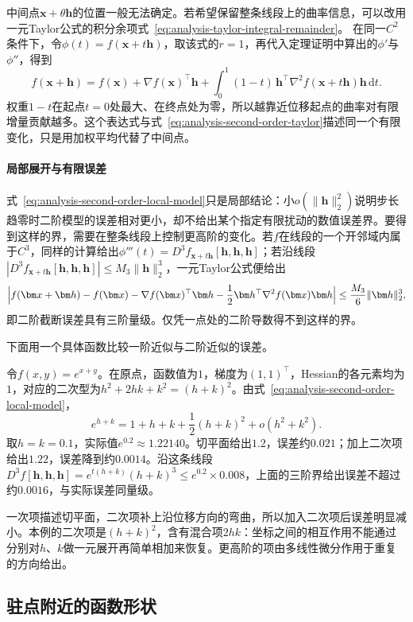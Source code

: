 中间点$\bm x+\theta\bm h$的位置一般无法确定。若希望保留整条线段上的曲率信息，可以改用一元Taylor公式的积分余项式~\eqref{eq:analysis-taylor-integral-remainder}。
在同一$C^2$条件下，令$\phi(t)=f(\bm x+t\bm h)$，取该式的$r=1$，再代入定理证明中算出的$\phi'$与$\phi''$，得到
\[
 f(\bm{x}+\bm{h})
 =f(\bm{x})+\nabla f(\bm{x})^{\top}\bm{h}
 +\int_0^1(1-t)\,\bm{h}^{\top}\nabla^2f(\bm{x}+t\bm{h})\bm{h}\,\mathrm{d}t.
\]
权重$1-t$在起点$t=0$处最大、在终点处为零，所以越靠近位移起点的曲率对有限增量贡献越多。这个表达式与式~\eqref{eq:analysis-second-order-taylor}描述同一个有限变化，只是用加权平均代替了中间点。

\paragraph{局部展开与有限误差}
式~\eqref{eq:analysis-second-order-local-model}只是局部结论：小$o(\lVert\bm h\rVert_2^2)$说明步长趋零时二阶模型的误差相对更小，却不给出某个指定有限扰动的数值误差界。要得到这样的界，需要在整条线段上控制更高阶的变化。若$f$在线段的一个开邻域内属于$C^3$，同样的计算给出$\phi'''(t)=D^3f_{\bm x+t\bm h}[\bm h,\bm h,\bm h]$；若沿线段$|D^3f_{\bm x+t\bm h}[\bm h,\bm h,\bm h]|\leq M_3\lVert\bm h\rVert_2^3$，一元Taylor公式便给出
\[
 \Bigl|f(\bm x+\bm h)-f(\bm x)-\nabla f(\bm x)^\top\bm h-\frac12\bm h^\top\nabla^2f(\bm x)\bm h\Bigr|\leq\frac{M_3}6\lVert\bm h\rVert_2^3 ,
\]
即二阶截断误差具有三阶量级。仅凭一点处的二阶导数得不到这样的界。

下面用一个具体函数比较一阶近似与二阶近似的误差。
\begin{example}[指数函数的二阶Taylor近似]
\label{ex:multivariable-exponential-taylor}
令$f(x,y)=e^{x+y}$。在原点，函数值为$1$，梯度为$(1,1)^\top$，Hessian的各元素均为$1$，对应的二次型为$h^2+2hk+k^2=(h+k)^2$。由式~\eqref{eq:analysis-second-order-local-model}，
\[
 e^{h+k}=1+h+k+\frac12(h+k)^2+o(h^2+k^2).
\]
取$h=k=0.1$，实际值$e^{0.2}\approx1.22140$。切平面给出$1.2$，误差约$0.021$；加上二次项给出$1.22$，误差降到约$0.0014$。沿这条线段$D^3f[\bm h,\bm h,\bm h]=e^{t(h+k)}(h+k)^3\leq e^{0.2}\times0.008$，上面的三阶界给出误差不超过约$0.0016$，与实际误差同量级。
\end{example}

一次项描述切平面，二次项补上沿位移方向的弯曲，所以加入二次项后误差明显减小。本例的二次项是$(h+k)^2$，含有混合项$2hk$：坐标之间的相互作用不能通过分别对$h$、$k$做一元展开再简单相加来恢复。更高阶的项由多线性微分作用于重复的方向给出。

\subsection{驻点附近的函数形状}

